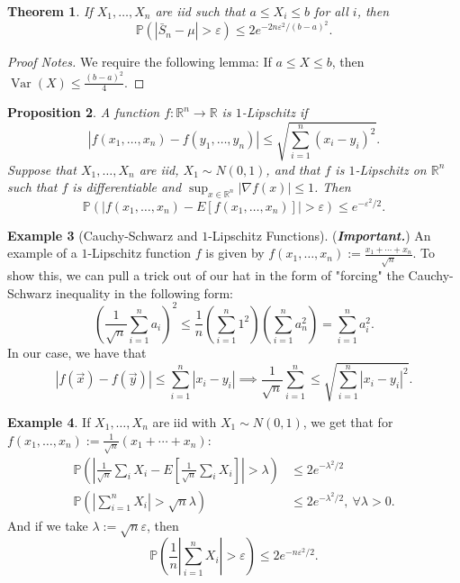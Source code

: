 \documentclass[12pt,reqno]{article}
\renewcommand{\emph}[1]{\textit{#1}}
\theoremstyle{plain}
\newtheorem{theorem}{Theorem}[section]
\newtheorem{prop}[theorem]{Proposition}
\theoremstyle{definition}
\newtheorem{example}[theorem]{Example}
\begin{document}
\begin{theorem}
If $X_1,\ldots,X_n$ are iid such that $a \leq X_i \leq b$ for all $i$, then 
$$\mathbb{P}(|\bar{S}_n-\mu| > \varepsilon) \leq 
  2e^{-2n\varepsilon^2 / (b-a)^2}.$$ 
\end{theorem} 
\begin{proof}[Proof Notes]
We require the following lemma: If $a \leq X \leq b$, then 
$\operatorname{Var}(X) \leq \frac{(b-a)^2}{4}$. 
\end{proof} 

\begin{prop} 
A function $f: \mathbb{R}^n \rightarrow \mathbb{R}$ is 
\emph{$1$-Lipschitz} if 
$$|f(x_1,\ldots,x_n) - f(y_1,\ldots,y_n)| \leq 
  \sqrt{\sum_{i=1}^n (x_i-y_i)^2}.$$ 
Suppose that $X_1,\ldots,X_n$ are iid, $X_1 \sim N(0, 1)$, and that $f$ 
is $1$-Lipschitz on $\mathbb{R}^n$ such that $f$ is differentiable and 
$\sup_{x \in \mathbb{R}^n} |\nabla f(x)| \leq 1$. Then 
$$\mathbb{P}\left(|f(x_1,\ldots,x_n) - E[f(x_1,\ldots,x_n)]| > 
  \varepsilon\right) \leq e^{-\varepsilon^2 / 2}.$$ 
\end{prop} 

\begin{example}[Cauchy-Schwarz and $1$-Lipschitz Functions] 
(\textbf{\emph{Important.}}) 
An example of a $1$-Lipschitz function $f$ is given by 
$f(x_1,\ldots,x_n) := \frac{x_1+\cdots+x_n}{\sqrt{n}}$. 
To show this, we can pull a trick out of our hat in the form of 
"forcing" the Cauchy-Schwarz inequality in the following form:
\[
\left(\frac{1}{\sqrt{n}} \sum_{i=1}^n a_i\right)^2 \leq 
     \frac{1}{n} \left(\sum_{i=1}^n 1^2\right)\left(\sum_{i=1}^n 
     a_n^2\right) = \sum_{i=1}^n a_i^2. 
\]
In our case, we have that 
\[
|f(\vec{x}) - f(\vec{y})| \leq \sum_{i=1}^n |x_i-y_i| \implies 
     \frac{1}{\sqrt{n}} \sum_{i=1}^n \leq \sqrt{\sum_{i=1}^n 
     |x_i-y_i|^2}. 
\]
\end{example} 

\begin{example}
If $X_1,\ldots,X_n$ are iid with $X_1 \sim N(0, 1)$, we get that for 
$f(x_1,\ldots,x_n) := \frac{1}{\sqrt{n}}(x_1+\cdots+x_n)$:
\begin{align*} 
\mathbb{P}\left(\left\lvert \frac{1}{\sqrt{n}} \sum_i X_i - 
     E\left[\frac{1}{\sqrt{n}} \sum_i X_i\right]\right\rvert > 
     \lambda\right) & \leq 2e^{-\lambda^2/2} \\ 
\mathbb{P}\left(\left\lvert\sum_{i=1}^n X_i\right\rvert > \sqrt{n}\lambda 
     \right) & \leq 2e^{-\lambda^2/2},\ \forall \lambda > 0. 
\end{align*} 
And if we take $\lambda := \sqrt{n} \varepsilon$, then 
\[
\mathbb{P}\left(\frac{1}{n}\left\lvert \sum_{i=1}^n X_i\right\rvert > 
     \varepsilon\right) \leq 2e^{-n\varepsilon^2 / 2}. 
\]
\end{example} 
\end{document}
